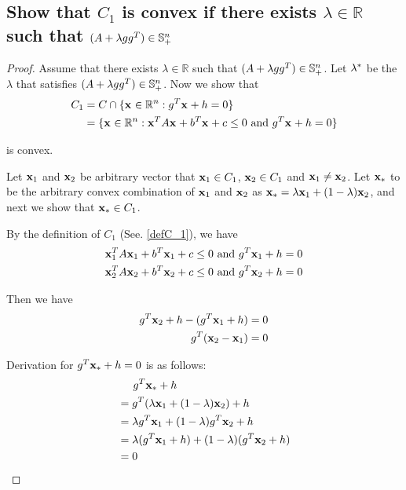 \documentclass[11pt,a4paper]{article}
\begin{document}
\subsection{Show that $C_1$ is convex if there exists $\lambda \in
    \mathbb{R}$ such that $(A + \lambda gg^T) \in \mathbb{S}_{+}^{n}$}
\begin{proof}
    Assume that there exists $\lambda \in \mathbb{R}$ such that $(A + \lambda gg^T) \in \mathbb{S}_{+}^{n}$.
    Let $\lambda^{*}$ be the $\lambda$ that satisfies $(A + \lambda gg^T) \in \mathbb{S}_{+}^{n}$.
    Now we show that 
    \begin{align}
        C_1 &= C \cap \{\mathbf{x}_{} \in \mathbb{R}^{n}: g^T \mathbf{x}_{} + h = 0\} \\
        &=  \{\mathbf{x}_{} \in \mathbb{R}^{n}: \mathbf{x}_{}^{T} A \mathbf{x}_{} + b^T \mathbf{x}_{} + c \leq 0 \text{ and } g^T \mathbf{x}_{} + h = 0\}
        \label{defC_1}
    \end{align}

    is convex. 

    Let $\mathbf{x}_{1}$ and $\mathbf{x}_{2}$ be arbitrary vector that $\mathbf{x}_{1} \in C_1$, $\mathbf{x}_{2} \in C_1$
    and $\mathbf{x}_{1} \not = \mathbf{x}_{2}$. Let $\mathbf{x}_{*}$ to be the arbitrary convex
    combination of $\mathbf{x}_{1}$ and $\mathbf{x}_{2}$ as $\mathbf{x}_{*} = \lambda \mathbf{x}_{1} + (1-\lambda) \mathbf{x}_{2}$, and next we show
    that $\mathbf{x}_{*} \in C_1$.

    By the definition of $C_1$ (See. \eqref{defC_1}), we have
    \begin{align}
        \mathbf{x}_{1}^{T} A \mathbf{x}_{1} + b^T \mathbf{x}_{1} + c \leq 0 \text{ and } g^T \mathbf{x}_{1} + h = 0 \\
        \mathbf{x}_{2}^{T} A \mathbf{x}_{2} + b^T \mathbf{x}_{2} + c \leq 0 \text{ and } g^T \mathbf{x}_{2} + h = 0 
    \end{align}
    
    Then we have
    \begin{align}
        g^T \mathbf{x}_{2} + h - (g^T \mathbf{x}_{1} + h)= 0 \\
        g^T (\mathbf{x}_{2}-\mathbf{x}_{1}) = 0
    \end{align}
    
    Derivation for $g^T \mathbf{x}_{*} + h = 0$ is as follows:
    \begin{align}
        & \hspace{0.5cm} g^T \mathbf{x}_{*} + h \\
        & = g^T (\lambda \mathbf{x}_{1} + (1-\lambda) \mathbf{x}_{2}) + h \\
        & = \lambda g^T \mathbf{x}_{1} + (1-\lambda)g^T \mathbf{x}_{2} + h \\
        & = \lambda (g^T \mathbf{x}_{1} + h) + (1-\lambda)(g^T \mathbf{x}_{2} + h) \\
        & = 0
    \end{align}


\end{proof}
\end{document}
